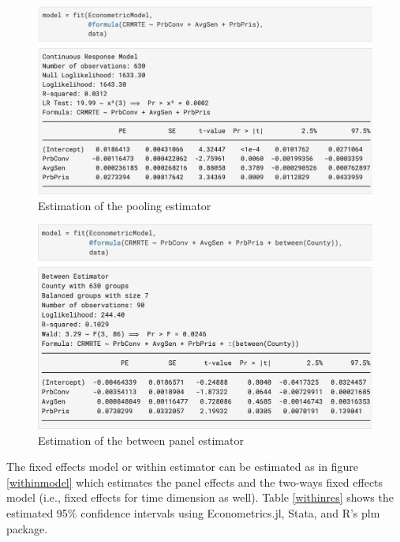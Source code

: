 \documentclass{juliacon}
\begin{document}
\begin{figure}[hbpt]
    \includegraphics[max width=\linewidth,center]{estimator_pooling}
	\caption{Estimation of the pooling estimator}
	\label{estimator_pooling}
\end{figure}

\begin{figure}[hbpt]
    \includegraphics[max width=\linewidth,center]{estimator_between}
	\caption{Estimation of the between panel estimator}
	\label{estimator_between}
\end{figure}

The fixed effects model or within estimator can be estimated as in figure \vref{withinmodel} which estimates the panel effects and the two-ways fixed effects model (i.e., fixed effects for time dimension as well). Table \vref{withinres} shows the estimated 95\% confidence intervals using Econometrics.jl, Stata, and R's plm package.
\end{document}
